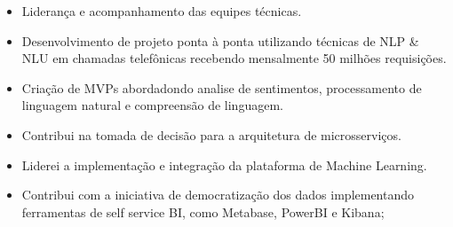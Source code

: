 \documentclass[10pt,a4paper,ragged2e]{altacv}
\begin{document}
\begin{itemize}
												
	\item Liderança e acompanhamento das equipes técnicas.
	      	      	      	      	      	      	      	      	      	      	      	      
	\item Desenvolvimento de projeto ponta à ponta utilizando técnicas de NLP \& NLU 
	      em chamadas telefônicas recebendo mensalmente 50 milhões requisições.
	      	      	      	      	      	      	      	      	      	      	      	      
	\item Criação de MVPs abordadondo analise de sentimentos, processamento de linguagem 
	      natural e compreensão de linguagem. 
	      	      	      	      	      	      	      	      	      	      	      	      
	\item Contribui na tomada de decisão para a arquitetura de microsserviços.
	      	      	      	      	      	      	      	      	      	      	      	      
	\item Liderei a implementação e integração da plataforma de Machine Learning.
	      	      	      	      	      	      	      	      	      	      	      	             
	\item Contribui com a iniciativa de democratização dos dados implementando ferramentas
	      de self service BI, como Metabase, PowerBI e Kibana;
	      	      	      	      	      	      	      	      	      	      	      	      
\end{itemize}



\divider






\clearpage
\end{document}
